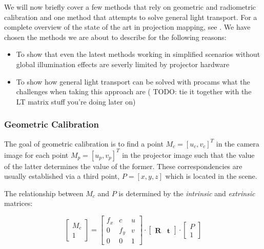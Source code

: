 We will now briefly cover a few methods that rely on geometric and radiometric calibration and one method that attempts to solve general light transport. For a complete overview of the state of the art in projection mapping, see \citet{Grundhofer2018}. We have chosen the methods we are about to describe for the following reasons:

\begin{itemize}
    \item To show that even the latest methods working in simplified scenarios without global illumination effects are severly limited by projector hardware
    \item To show how general light transport can be solved with procams what the challenges when taking this approach are ({\color{red} TODO: tie it together with the LT matrix stuff you're doing later on})
\end{itemize}

\subsubsection{Geometric Calibration}
\label{section:background-projection_mapping-procams-geometric_calibration}

The goal of geometric calibration is to find a point \(M_c = [u_c, v_c]^T\) in the camera image for each point \(M_p = [u_p, v_p]^T\) in the projector image such that the value of the latter determines the value of the former. These correspondencies are usually established via a third point, \(P = [x, y, z]\) which is located in the scene.

The relationship between \(M_c\) and \(P\) is determined by the \textit{intrinsic} and \textit{extrinsic} matrices:

\begin{equation}
    \label{eq:camera_equation}
    \begin{bmatrix}
        M_c \\
        1
    \end{bmatrix} =
    \begin{bmatrix}
        f_x & c & u \\
        0 & f_y & v \\
        0 & 0 & 1 
    \end{bmatrix} \cdot
    \begin{bmatrix}
        \mathbf{R} & \mathbf{t}
    \end{bmatrix} \cdot
    \begin{bmatrix}
        P \\
        1
    \end{bmatrix}
\end{equation}


